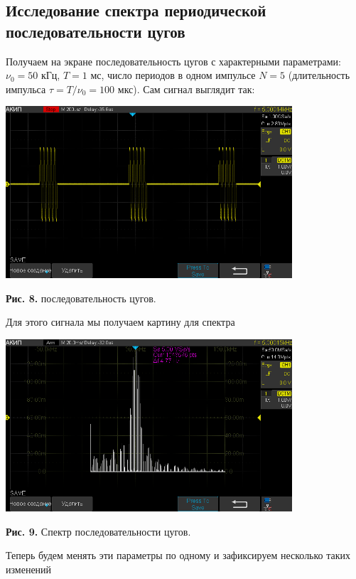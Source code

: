 \documentclass[a4paper, 12pt]{article}%
\begin{document}
\subsection*{Исследование спектра периодической последовательности цугов}
Получаем на экране последовательность цугов с характерными параметрами: $\nu_0 = 50$ кГц, $T = 1$ мс, число периодов в одном импульсе $N = 5$ (длительность импульса $\tau = T/\nu_0 = 100$ мкс).
Сам сигнал выглядит так:
\begin{center}
\includegraphics[width = 0.8\textwidth]{AKIP0008.png}

\textbf{Рис. 8.} последовательность цугов.
\end{center}
Для этого сигнала мы получаем картину для спектра
\begin{center}
\includegraphics[width = 0.8\textwidth]{AKIP0009.png}

\textbf{Рис. 9.} Спектр последовательности цугов.
\end{center}
Теперь будем менять эти параметры по одному и зафиксируем несколько таких изменений
\end{document}
